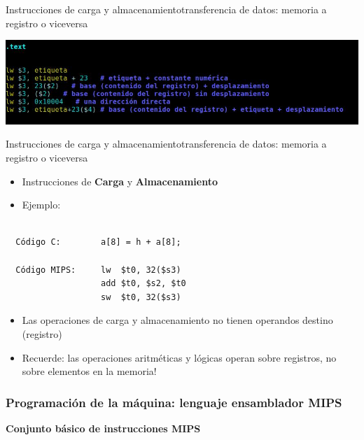 \documentclass[aspectratio=169,compress]{beamer}
\begin{document}
\begin{footnotesize}
\begin{frame}{Instrucciones de carga y almacenamiento}{transferencia de datos: memoria a registro o viceversa}
\begin{itemize}
\includegraphics[scale=0.4]{images/formatos.jpg} 


\end{itemize}
\end{frame}


\begin{frame}[fragile]{Instrucciones de carga y almacenamiento}{transferencia de datos: memoria a registro o viceversa}

\begin{itemize}
\item Instrucciones de \textbf{Carga} y \textbf{Almacenamiento}
\item Ejemplo:
\end{itemize}
\begin{verbatim}

  Código C:        a[8] = h + a[8];

  Código MIPS:     lw  $t0, 32($s3)
                   add $t0, $s2, $t0
                   sw  $t0, 32($s3)
\end{verbatim}
\begin{itemize}
\item Las operaciones de carga y almacenamiento no tienen operandos destino (registro)
\item Recuerde: las operaciones aritméticas y lógicas operan sobre registros, no sobre elementos en la memoria!
\end{itemize}
\end{frame}



\begin{frame}
\frametitle{Programación de la máquina: lenguaje ensamblador MIPS}
        \begin{center}
        \textbf{Conjunto básico de instrucciones MIPS}
        \end{center}
\begin{tabular}{cl}


\end{tabular}
\end{frame}
\end{footnotesize}
\end{document}
